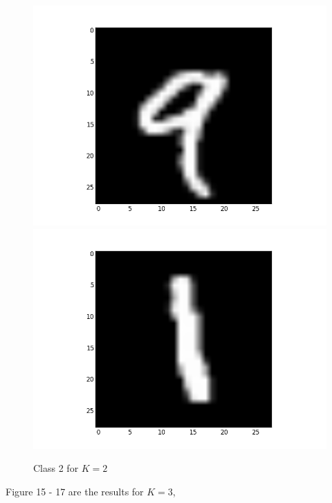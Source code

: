 \documentclass[submit]{harvardml}
\begin{document}
\begin{figure}[ht]
    \includegraphics[scale=0.15]{K2-representative-1-2}
    \includegraphics[scale=0.15]{K2-representative-1-3}
    \caption{Class 2 for $K=2$}
\end{figure}

Figure 15 - 17 are the results for $K=3$,
\end{document}
